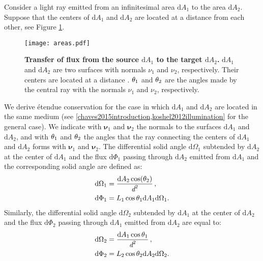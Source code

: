 Consider a light ray emitted from an infinitesimal area $\textrm{d}A_1$ to the area $\textrm{d}A_2$. Suppose that the centers of $\textrm{d}A_1$ and $\textrm{d}A_2$ 
are located at a distance  from each other, see Figure \ref{fig:etendue_conservation}.
\begin{figure}[t]
 \label{fig:etendue_conservation}
     \begin{center}
     \texttt{[image: areas.pdf]}
     \end{center}
     \caption{\textbf{Transfer of flux from the source $\textrm{d}A_1$ to the target $\textrm{d}A_2$.} $\textrm{d}A_1$ and $\textrm{d}A_2$ are two surfaces with normals $\nu_1$ and $\nu_2$, respectively. Their centers are located at a distance .
$\theta_1$ and $\theta_2$ are the angles made by the central ray with the normals $\nu_1$ and $\nu_2$, respectively.}
\label{fig:etendue_conservation}
 \end{figure}
We derive \'{e}tendue conservation for the case in which $\textrm{d}A_1$ and $\textrm{d}A_2$ are located in the same medium (see \ref{chaves2015introduction,koshel2012illumination} for the general case).
We indicate with $\boldsymbol{\nu}_1$ and $\boldsymbol{\nu}_2$ the normals to the surfaces $\textrm{d}A_1$ and $\textrm{d}A_2$, and with $\theta_1$ and $\theta_2$ the angles that the ray connecting the centers of $\textrm{d}A_1$ and $\textrm{d}A_2$ forms with $\boldsymbol{\nu}_1$ and $\boldsymbol{\nu}_2$. The differential solid angle $\textrm{d}\Omega_1$ subtended by $\textrm{d}A_2$ at the center of $\textrm{d}A_1$ and the flux $\textrm{d}\Phi_1$ passing through $\textrm{d}A_2$ emitted from $\textrm{d}A_1$ and the corresponding solid angle are defined as:
\begin{subequations}
\begin{align}
\label{eq:omega1}
\textrm{d}\Omega_1 &= \frac{\textrm{d}A_2\cos(\theta_2)}{\textit{d}^2}\,,\\
\textrm{d}\Phi_1 &= L_1 \cos\theta_1 \textrm{d}A_1 \textrm{d}\Omega_1. \label{eq:phi1}
\end{align}
\end{subequations}
Similarly, the differential solid angle $\textrm{d}\Omega_2$ subtended by $\textrm{d}A_1$ at the center of $\textrm{d}A_2$ and the flux $\textrm{d}\Phi_2$ passing through $\textrm{d}A_1$ emitted from $\textrm{d}A_2$ are equal to:
\begin{subequations}\begin{align}\label{eq:omega2}
\textrm{d}\Omega_2 &= \frac{\textrm{d}A_1\cos\theta_1}{\textit{d}^2}\,,\\
\textrm{d}\Phi_2 &= L_2 \cos\theta_2 \textrm{d}A_2 \textrm{d}\Omega_2.\label{eq:phi2}
\end{align}
\end{subequations}
